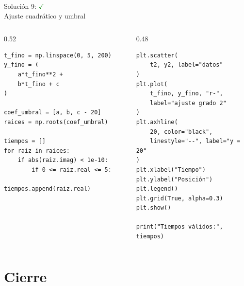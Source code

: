 \documentclass[10pt]{beamer}
\begin{document}
\begin{solutionblock}
\begin{frame}[fragile]{Solución 9: \hfill \textcolor{green}{$\checkmark$} \\ Ajuste cuadrático y umbral}
\begin{columns}
\begin{column}{0.52\textwidth}
\begin{verbatim}
t_fino = np.linspace(0, 5, 200)
y_fino = (
    a*t_fino**2 +
    b*t_fino + c
)

coef_umbral = [a, b, c - 20]
raices = np.roots(coef_umbral)

tiempos = []
for raiz in raices:
    if abs(raiz.imag) < 1e-10:
        if 0 <= raiz.real <= 5:
            tiempos.append(raiz.real)
\end{verbatim}
\end{column}
\begin{column}{0.48\textwidth}
\begin{verbatim}
plt.scatter(
    t2, y2, label="datos"
)
plt.plot(
    t_fino, y_fino, "r-",
    label="ajuste grado 2"
)
plt.axhline(
    20, color="black",
    linestyle="--", label="y = 20"
)
plt.xlabel("Tiempo")
plt.ylabel("Posición")
plt.legend()
plt.grid(True, alpha=0.3)
plt.show()

print("Tiempos válidos:", tiempos)
\end{verbatim}
\end{column}
\end{columns}
\end{frame}
\end{solutionblock}

\section{Cierre}
\end{document}
